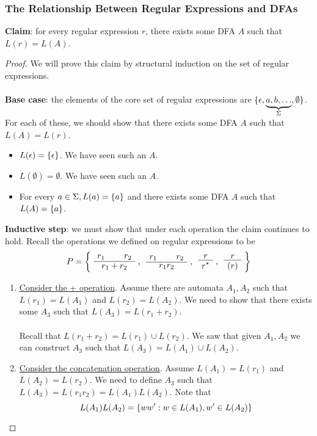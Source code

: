 \documentclass[]{article}
\DeclarePairedDelimiter{\set}{\lbrace}{\rbrace}
\theoremstyle{definition}
\newcommand{\lecture}[1]{\marginpar{{\footnotesize $\leftarrow$ \underline{#1}}}}
\begin{document}
      \subsubsection{The Relationship Between  Regular Expressions and DFAs} \lecture{September 26, 2013}
        \textbf{Claim}: for every regular expression $r$, there exists some DFA $A$ such that $L(r) = L(A)$.

        \begin{proof}
          We will prove this claim by structural induction on the set of regular expressions.
          \\ \\
          \textbf{Base case}: the elements of the core set of regular expressions are $\set{ \epsilon, \underbrace{a, b, \ldots}_{\Sigma}, \emptyset}$. For each of these, we should show that there exists some DFA $A$ such that $L(A) = L(r)$.
          \begin{itemize}
            \item $L(\epsilon) = \set{ \epsilon }$. We have seen such an $A$.
            \item $L(\emptyset) = \emptyset$. We have seen such an $A$.
            \item For every $a \in \Sigma, L(a) = \set{a}$ and there exists some DFA $A$ such that $L(A) = \set{a}$.
          \end{itemize}

          \textbf{Inductive step}: we must show that under each operation the claim continues to hold. Recall the operations we defined on regular expressions to be
          $$
            P = \bigg\{ \text{\AxiomC{$r_1$} \AxiomC{$r_2$} \BinaryInfC{$r_1 + r_2$} \DisplayProof, \AxiomC{$r_1$} \AxiomC{$r_2$} \BinaryInfC{$r_1 r_2$} \DisplayProof, \AxiomC{$r$} \UnaryInfC{$r^\star$} \DisplayProof, \AxiomC{$r$} \UnaryInfC{$(r)$} \DisplayProof} \bigg\}
          $$

          \begin{enumerate}
            \item \underline{Consider the + operation}. Assume there are automata $A_1, A_2$ such that $L(r_1) = L(A_1)$ and $L(r_2) = L(A_2)$. We need to show that there exists some $A_3$ such that $L(A_3) = L(r_1 + r_2)$.
            \\ \\
            Recall that $L(r_1 + r_2) = L(r_1) \cup L(r_2)$. We saw that given $A_1, A_2$ we can construct $A_3$ such that $L(A_3) = L(A_1) \cup L(A_2)$.

            \item \underline{Consider the concatenation operation}. Assume $L(A_1) = L(r_1)$ and $L(A_2) = L(r_2)$. We need to define $A_3$ such that $L(A_3) = L(r_1 r_2) = L(A_1) L(A_2)$. Note that
            $$
              L(A_1) L(A_2) = \set{ w w' : w \in L(A_1), w' \in L(A_2) }
            $$


\end{enumerate}
\end{proof}
\end{document}
